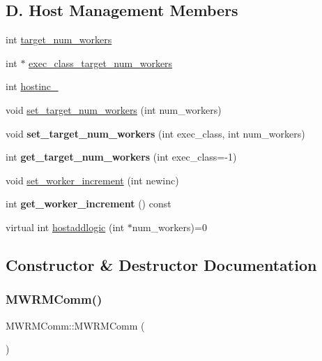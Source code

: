 \subsection*{D. Host Management Members}
\begin{DoxyCompactItemize}
\item 
int \hyperlink{classMWRMComm_ada92e3d26d11d240b121b7452a5ac7f9}{target\+\_\+num\+\_\+workers}
\item 
int $\ast$ \hyperlink{classMWRMComm_ab61af84df9df94c41c9f3c428775b58a}{exec\+\_\+class\+\_\+target\+\_\+num\+\_\+workers}
\item 
int \hyperlink{classMWRMComm_a6c742808ed04090144b1247933b2ff7e}{hostinc\+\_\+}
\item 
void \hyperlink{classMWRMComm_a9723b0a13c493923e1282d7832b86b65}{set\+\_\+target\+\_\+num\+\_\+workers} (int num\+\_\+workers)
\item 
\mbox{\label{classMWRMComm_ace352001b604de4cd829960414fcb09d}} 
void {\bfseries set\+\_\+target\+\_\+num\+\_\+workers} (int exec\+\_\+class, int num\+\_\+workers)
\item 
\mbox{\label{classMWRMComm_ab662b2fc47855cd46d9b6a9ba2f552e8}} 
int {\bfseries get\+\_\+target\+\_\+num\+\_\+workers} (int exec\+\_\+class=-\/1)
\item 
void \hyperlink{classMWRMComm_adcb46dfbabd51a0690d70e39a0396659}{set\+\_\+worker\+\_\+increment} (int newinc)
\item 
\mbox{\label{classMWRMComm_a89caf7a6465de613d392cf04a65430a1}} 
int {\bfseries get\+\_\+worker\+\_\+increment} () const
\item 
virtual int \hyperlink{classMWRMComm_a4ded74716925e2213d6f898543491ce1}{hostaddlogic} (int $\ast$num\+\_\+workers)=0
\end{DoxyCompactItemize}


\subsection{Constructor \& Destructor Documentation}
\mbox{\label{classMWRMComm_a94ada3d2aa96190bf5444dfc64dd7147}} 
\subsubsection{\texorpdfstring{M\+W\+R\+M\+Comm()}{MWRMComm()}}
{\footnotesize\ttfamily M\+W\+R\+M\+Comm\+::\+M\+W\+R\+M\+Comm (\begin{DoxyParamCaption}{ }\end{DoxyParamCaption})}

